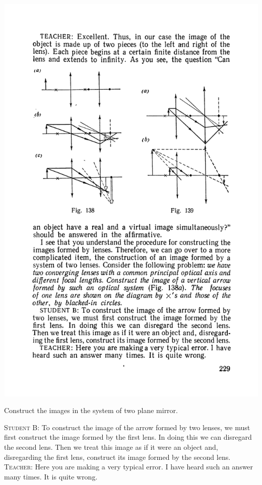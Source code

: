 \documentclass[a4paper,sfsidenotes]{tufte-book}
\begin{document}
\begin{marginfigure}%
\includegraphics[width=1.1\linewidth]{fig-138a}
\caption{Construct the images in the system of two plane mirror.}
\label{fig-138}
\end{marginfigure}
\textsc{Student B:} To construct the image of the arrow formed by two lenses, we must first construct the image formed by the first lens. In doing this we can disregard the second lens. Then we treat this image as if it were an object and, disregarding the first lens, construct its image formed by the second lens.
\\
\textsc{Teacher:} Here you are making a very typical error. I have heard such an answer many times. It is quite wrong.
\end{document}
